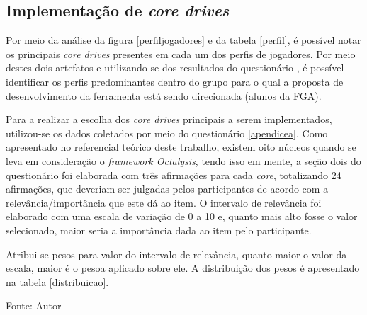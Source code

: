 \subsection{Implementação de \textit{core drives}}


Por meio da análise da figura \ref{perfiljogadores} e da tabela \ref{perfil}, é possível notar os principais \textit{core drives} 
presentes em cada um dos perfis de jogadores. Por meio destes dois artefatos e utilizando-se dos resultados do questionário , é possível 
identificar os perfis predominantes dentro do grupo para o qual a proposta de desenvolvimento da ferramenta está sendo direcionada 
(alunos da FGA).

Para a realizar a escolha dos \textit{core drives} principais a serem implementados, utilizou-se os dados coletados por meio do questionário
\ref{apendicea}. Como apresentado no referencial teórico deste trabalho, existem oito núcleos quando se leva em consideração o \textit{framework Octalysis},
tendo isso em mente, a seção dois do questionário foi elaborada com três afirmações para cada \textit{core}, totalizando 24 afirmações, que deveriam ser julgadas
pelos participantes de acordo com a relevância/importância que este dá ao item. O intervalo de relevância foi elaborado com uma escala de variação de 0 a 10 e, quanto mais alto
fosse o valor selecionado, maior seria a importância dada ao item pelo participante.

Atribui-se pesos para valor do intervalo de relevância, quanto maior o valor da escala, maior é o pesoa aplicado sobre ele. A distribuição dos pesos
é apresentado na tabela \ref{distribuicao}.

\begin{table}[h]
	\centering
	\caption{Distribuição dos pesos na escala}
	\label{distribuicao}
	Fonte: Autor
\end{table}

